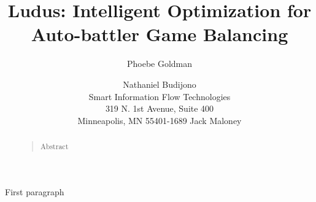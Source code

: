 \documentclass[letterpaper]{article}
\begin{document}
%
\title{Ludus: Intelligent Optimization for \\ Auto-battler Game Balancing}
\author{Phoebe Goldman \and Nathaniel Budijono \\
Smart Information Flow Technologies \\
319 N. 1st Avenue, Suite 400 \\
Minneapolis, MN 55401-1689 \And Jack Maloney
}
\maketitle
\begin{abstract}
\begin{quote}
Abstract
\end{quote}
\end{abstract}

\noindent First paragraph
\end{document}
